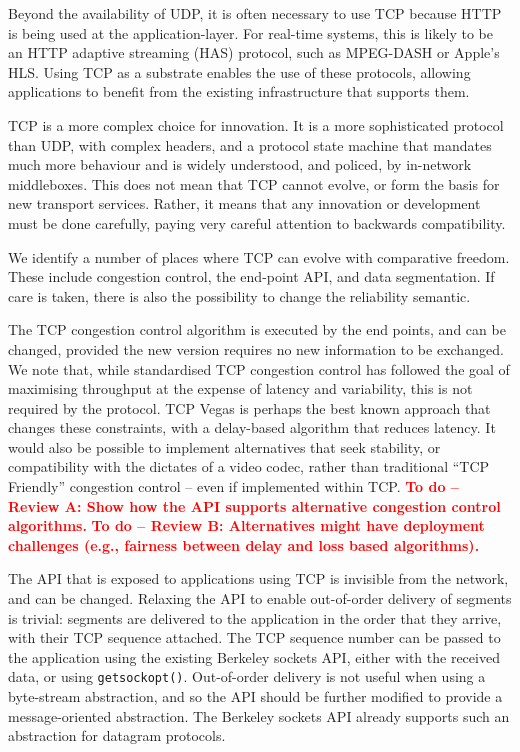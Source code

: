 \documentclass[10pt]{sig-alternate-05-2015}
\newcommand{\todo}[1]{\textbf{\textcolor{red}{To do -- #1}}}
\begin{document}
Beyond the availability of UDP, it is often necessary to use TCP because
HTTP is being used at the application-layer. For real-time systems, this
is likely to be an HTTP adaptive streaming (HAS) protocol, such as
MPEG-DASH or Apple's HLS. Using TCP as a substrate enables the use of these
protocols, allowing applications to benefit from the existing
infrastructure that supports them.

TCP is a more complex choice for innovation. It is a more sophisticated
protocol than UDP, with complex headers, and a protocol state machine
that mandates much more behaviour and is widely understood, and policed,
by in-network middleboxes. This does not mean that TCP cannot evolve, or
form the basis for new transport services. Rather, it means that any
innovation or development must be done carefully, paying very careful
attention to backwards compatibility.

We identify a number of places where TCP can evolve with comparative
freedom. These include congestion control, the end-point API, and data
segmentation. If care is taken, there is also the possibility to change
the reliability semantic.

The TCP congestion control algorithm is executed by the end points, and
can be changed, provided the new version requires no new information to
be exchanged.
We note that, while standardised TCP congestion control has followed the
goal of maximising throughput at the expense of latency and variability,
this is not required by the protocol. TCP Vegas \cite{brakmo:1994:tcp-vegas}
is perhaps the best known approach that changes these constraints, with a
delay-based algorithm that reduces latency. It would also be possible to
implement alternatives that seek stability, or compatibility with the
dictates of a video codec, rather than traditional ``TCP Friendly''
congestion control -- even if implemented within TCP.
\todo{Review A: Show how the API supports alternative congestion control
algorithms.}
\todo{Review B: Alternatives might have deployment challenges (e.g.,
fairness between delay and loss based algorithms).}

The API that is exposed to applications using TCP is invisible from the
network, and can be changed. Relaxing the API to enable out-of-order
delivery of segments is trivial: segments are delivered to the application
in the order that they arrive, with their TCP sequence attached. The TCP
sequence number can be passed to the application using the existing
Berkeley sockets API, either with the received data, or using
\texttt{getsockopt()}. Out-of-order delivery is not useful when using a
byte-stream abstraction, and so the API should be further modified to
provide a message-oriented abstraction. The Berkeley sockets API already
supports such an abstraction for datagram protocols.
\end{document}
